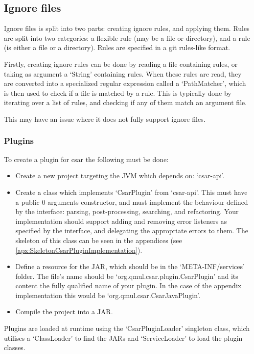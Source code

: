\documentclass[12pt, letterpaper]{article}
\begin{document}
\subsection{Ignore files}
Ignore files is split into two parts: creating ignore rules, and applying them.
Rules are split into two categories: a flexible rule (may be a file or directory), and a rule (is either a file or a directory).
Rules are specified in a git rules-like format.

Firstly, creating ignore rules can be done by reading a file containing rules, or taking as argument a `String' containing rules.
When these rules are read, they are converted into a specialized regular expression called a `PathMatcher', which is then used to check if a file is matched by a rule.
This is typically done by iterating over a list of rules, and checking if any of them match an argument file.

This may have an issue where it does not fully support ignore files.

\subsubsection{Plugins}
To create a plugin for csar the following must be done:
\begin{itemize}
  \item Create a new project targeting the JVM which depends on: `csar-api'.
  \item Create a class which implements `CsarPlugin' from `csar-api'.
  This must have a public 0-arguments constructor, and must implement the behaviour defined by the interface: parsing, post-processing, searching, and refactoring.
  Your implementation should support adding and removing error listeners as specified by the interface, and delegating the appropriate errors to them.
  The skeleton of this class can be seen in the appendices (see \ref{apx:SkeletonCsarPluginImplementation}).
  \item Define a resource for the JAR, which should be in the `META-INF/services' folder.
  The file's name should be `org.qmul.csar.plugin.CsarPlugin' and its content the fully qualified name of your plugin.
  In the case of the appendix implementation this would be `org.qmul.csar.CsarJavaPlugin'.
  \item Compile the project into a JAR.
\end{itemize}

Plugins are loaded at runtime using the `CsarPluginLoader' singleton class, which utilises a `ClassLoader' to find the JARs and `ServiceLoader' to load the plugin classes.
\end{document}
